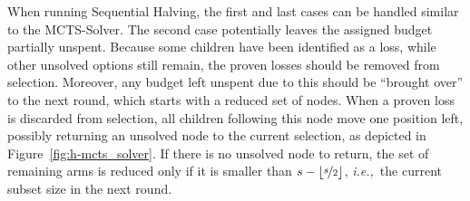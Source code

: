 \documentclass{kecsmstr}
\DeclarePairedDelimiter{\floor}{\lfloor}{\rfloor}
\newcommand{\ie}{{\it i.e.,}~}
\begin{document}
When running Sequential Halving, the first and last cases can be handled similar to the MCTS-Solver. The second case potentially leaves the assigned budget partially unspent. Because some children have been identified as a loss, while other unsolved options still remain, the proven losses should be removed from selection. Moreover, any budget left unspent due to this should be ``brought over'' to the next round, which starts with a reduced set of nodes. When a proven loss is discarded from selection, all children following this node move one position left, possibly returning an unsolved node to the current selection, as depicted in Figure~\ref{fig:h-mcts_solver}. If there is no unsolved node to return, the set of remaining arms is reduced only if it is smaller than $s - \floor{\nicefrac{s}{2}}$, \ie the current subset size in the next round. 
\end{document}
